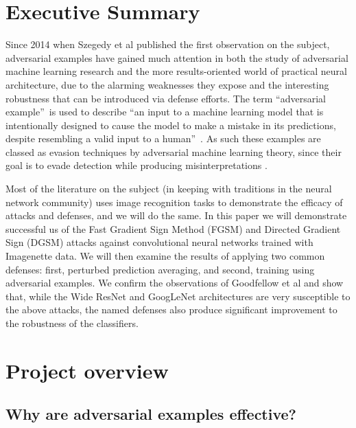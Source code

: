 \documentclass[conference]{IEEEtran}
\begin{document}
\tableofcontents%

\bigskip

\section{Executive Summary}

Since 2014 when Szegedy et al \cite{szegedy2014intriguing} published the
first observation on the subject, adversarial examples have gained much
attention in both the study of adversarial machine learning research and the
more results-oriented world of practical neural architecture, due to the
alarming weaknesses they expose and the interesting robustness that can be
introduced via defense efforts. The term \textquotedblleft adversarial
example\textquotedblright\ is used to describe \textquotedblleft an input to
a machine learning model that is intentionally designed to cause the model
to make a mistake in its predictions, despite resembling a valid input to a
human\textquotedblright\ \cite{wiyatno2019adversarial}. As such these
examples are classed as evasion techniques by adversarial machine learning
theory, since their goal is to evade detection while producing
misinterpretations \cite{wiki:aml}.

Most of the literature on the subject (in keeping with traditions in the
neural network community) uses image recognition tasks to demonstrate the
efficacy of attacks and defenses, and we will do the same. In this paper we
will demonstrate successful us of the Fast Gradient Sign Method (FGSM) \cite%
{goodfellow2014explaining} and Directed Gradient Sign (DGSM) \cite%
{madry2020adversarial} attacks against convolutional neural networks trained
with Imagenette data. We will then examine the results of applying two
common defenses: first, perturbed prediction averaging, and second, training
using adversarial examples. We confirm the observations of Goodfellow et al 
\cite{goodfellow2014explaining} and show that, while the Wide ResNet and
GoogLeNet architectures are very susceptible to the above attacks, the named
defenses also produce significant improvement to the robustness of the
classifiers.

\section{Project overview}

\subsection{Why are adversarial examples effective?}
\end{document}
